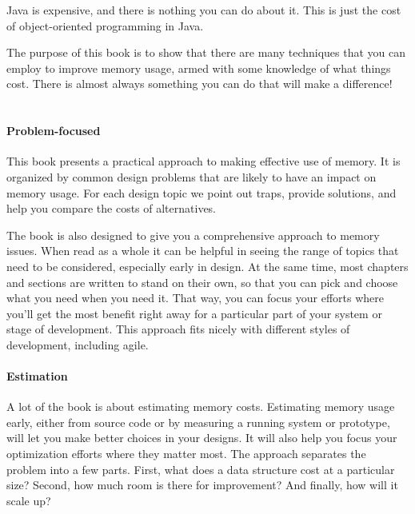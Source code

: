 {Java is expensive, and there is nothing you can do about it.
This is just the cost of object-oriented programming in Java.
}

The purpose of this book is to show that there are
many techniques that you can employ to improve memory usage, armed with some
knowledge of what things cost. There is almost always something you can do that
will make a difference!



\section{\thetitle}
\paragraph{Problem-focused}This book presents a practical approach to making
effective use of memory.
It is organized by
common design problems that are likely to have an impact on memory usage.
For each design topic we point out traps, provide solutions, and help you
compare the costs of alternatives.

The book is also designed to give you a comprehensive
approach to memory issues. When read as a whole it can be helpful in seeing the range of topics that need to
be considered, especially early in design. At the same time, most chapters and sections are written to stand
on their own, so that you can pick and choose what you need when you need it. That way, you can focus your efforts
where you'll get the most benefit right away for a particular part of your system or stage of development. 
This approach fits nicely with different styles of development, including agile.

\paragraph{Estimation}A lot of the book is about estimating memory costs. 
Estimating memory usage early, either from source code
or by measuring a running system or prototype, will let you
make better choices in your designs.  It will also help you focus your
optimization efforts where they matter most.
The approach separates the problem into a few parts. First,
what does a data structure cost at a particular size? Second, how much room
is there for improvement? And finally, how will it scale up?

